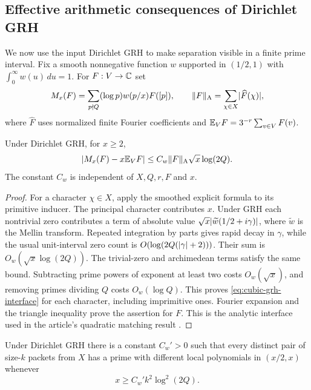 \subsection{Effective arithmetic consequences of Dirichlet GRH}

We now use the input Dirichlet GRH to make separation visible in a finite
prime interval. Fix a smooth nonnegative function $w$ supported in
$(1/2,1)$ with $\int_0^\infty w(u)\,du=1$. For $F:V\to\mathbb C$ set
\[
 M_x(F)=\sum_{p\nmid Q}(\log p)w(p/x)F([p]),
 \qquad \lVert F\rVert_{\mathrm A}=\sum_{\chi\in X}\lvert\widehat F(\chi)\rvert,
\]
where $\widehat F$ uses normalized finite Fourier coefficients and
$\mathbb E_V F=3^{-r}\sum_{v\in V}F(v)$.

\begin{lemma}\label{lem:cubic-grh}
Under Dirichlet GRH, for $x\geq2$,
\begin{equation}\label{eq:cubic-grh-interface}
 \lvert M_x(F)-x\mathbb E_V F\rvert
 \leq C_w\lVert F\rVert_{\mathrm A}\sqrt{x}\log(2Q).
\end{equation}
The constant $C_w$ is independent of $X,Q,r,F$ and $x$.
\end{lemma}

\begin{proof}
For a character $\chi\in X$, apply the smoothed explicit formula to its
primitive inducer. The principal character contributes $x$. Under GRH
each nontrivial zero contributes a term of absolute value
$\sqrt{x}\lvert\widetilde w(1/2+i\gamma)\rvert$, where
$\widetilde w$ is the Mellin transform. Repeated integration by parts
gives rapid decay in $\gamma$, while the usual unit-interval zero count
is $O(\log(2Q(\lvert\gamma\rvert+2)))$. Their sum is
$O_w(\sqrt{x}\log(2Q))$. The trivial-zero and archimedean terms satisfy
the same bound. Subtracting prime powers of exponent at least two costs
$O_w(\sqrt{x})$, and removing primes dividing $Q$ costs
$O_w(\log Q)$. This proves
\eqref{eq:cubic-grh-interface} for each character, including imprimitive
ones. Fourier expansion and the triangle inequality prove the assertion
for $F$. This is the analytic interface used in the article's quadratic
matching result \cite{article}.
\end{proof}

\begin{theorem}\label{thm:cubic-prime}
Under Dirichlet GRH there is a constant $C_w'>0$ such that every distinct
pair of size-$k$ packets from $X$ has a prime with different local
polynomials in $(x/2,x)$ whenever
\[
 x\geq C_w' k^2\log^2(2Q).
\]
\end{theorem}

